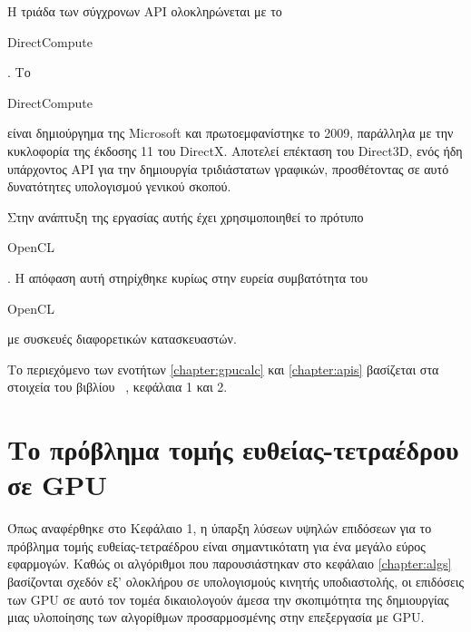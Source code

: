 Η τριάδα των σύγχρονων API ολοκληρώνεται με το \begin{english}DirectCompute\end{english}. Το \begin{english}DirectCompute\end{english} είναι δημιούργημα της Microsoft και πρωτοεμφανίστηκε το 2009, παράλληλα με την κυκλοφορία της έκδοσης 11 του DirectX. Αποτελεί επέκταση του Direct3D, ενός ήδη υπάρχοντος API για την δημιουργία τριδιάστατων γραφικών, προσθέτοντας σε αυτό δυνατότητες υπολογισμού γενικού σκοπού.

Στην ανάπτυξη της εργασίας αυτής έχει χρησιμοποιηθεί το πρότυπο \begin{english}OpenCL\end{english}. Η απόφαση αυτή στηρίχθηκε κυρίως στην ευρεία συμβατότητα του \begin{english}OpenCL\end{english} με συσκευές διαφορετικών κατασκευαστών. 

Το περιεχόμενο των ενοτήτων \ref{chapter:gpucalc} και \ref{chapter:apis} βασίζεται στα στοιχεία του βιβλίου ~\cite{MassivelyParallel}, κεφάλαια 1 και 2.


\section{Το πρόβλημα τομής ευθείας-τετραέδρου σε GPU}
\label{chapter:openclraytetra}
\noindent Όπως αναφέρθηκε στο Κεφάλαιο 1, η ύπαρξη λύσεων υψηλών επιδόσεων για το πρόβλημα τομής ευθείας-τετραέδρου είναι σημαντικότατη για ένα μεγάλο εύρος εφαρμογών. Καθώς οι αλγόριθμοι που παρουσιάστηκαν στο κεφάλαιο \ref{chapter:algs} βασίζονται σχεδόν εξ' ολοκλήρου σε υπολογισμούς κινητής υποδιαστολής, οι επιδόσεις των GPU σε αυτό τον τομέα δικαιολογούν άμεσα την σκοπιμότητα της δημιουργίας μιας υλοποίησης των αλγορίθμων προσαρμοσμένης στην επεξεργασία με GPU.


